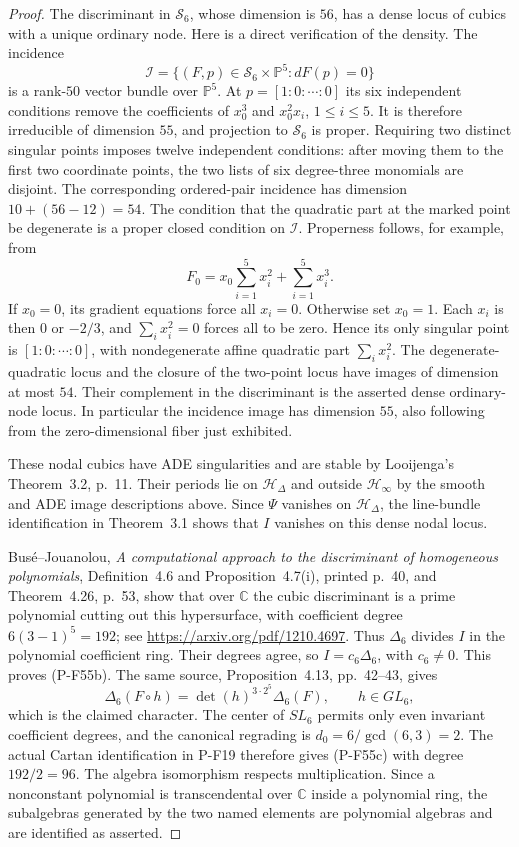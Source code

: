 \documentclass[11pt,a4paper]{article}
\begin{document}
\begin{proof}
The discriminant in $\mathscr S_6$, whose dimension is $56$,
has a dense locus of cubics with a unique ordinary node.
Here is a direct verification of the density. The incidence
\[
  \mathscr I=\{(F,p)\in\mathscr S_6\times\mathbb P^5:
                                  dF(p)=0\}
\]
is a rank-$50$ vector bundle over $\mathbb P^5$. At
$p=[1:0:\cdots:0]$ its six independent conditions remove
the coefficients of $x_0^3$ and $x_0^2x_i$, $1\le i\le5$.
It is therefore irreducible of dimension $55$, and projection
to $\mathscr S_6$ is proper. Requiring two distinct singular
points imposes twelve independent conditions: after moving
them to the first two coordinate points, the two lists of
six degree-three monomials are disjoint. The corresponding
ordered-pair incidence has dimension $10+(56-12)=54$.
The condition that the quadratic part at the marked point be
degenerate is a proper closed condition on $\mathscr I$.
Properness follows, for example, from
\[
        F_0=x_0\sum_{i=1}^5x_i^2+\sum_{i=1}^5x_i^3.
 \tag{P-F55f}
\]
If $x_0=0$, its gradient equations force all $x_i=0$.
Otherwise set $x_0=1$. Each $x_i$ is then $0$ or $-2/3$,
and $\sum_i x_i^2=0$ forces all to be zero. Hence its only
singular point is $[1:0:\cdots:0]$, with nondegenerate affine
quadratic part $\sum_i x_i^2$.
The degenerate-quadratic locus and the closure of the
two-point locus have images of dimension at most $54$.
Their complement in the discriminant is the asserted dense
ordinary-node locus. In particular the incidence image has
dimension $55$, also following from the zero-dimensional
fiber just exhibited.

These nodal cubics have ADE singularities and are stable by
Looijenga's Theorem~3.2, p.~11. Their periods lie on
$\mathcal H_\Delta$ and outside $\mathcal H_\infty$ by
the smooth and ADE image descriptions above.
Since $\Psi$ vanishes on $\mathcal H_\Delta$, the
line-bundle identification in Theorem~3.1 shows that $I$
vanishes on this dense nodal locus.

Bus\'e--Jouanolou, \emph{A computational approach to the
discriminant of homogeneous polynomials}, Definition~4.6 and
Proposition~4.7(i), printed p.~40, and Theorem~4.26, p.~53,
show that over $\mathbb C$ the cubic discriminant is a prime
polynomial cutting out this hypersurface, with coefficient
degree $6(3-1)^5=192$; see
\url{https://arxiv.org/pdf/1210.4697}.
Thus $\Delta_6$ divides $I$ in the polynomial coefficient
ring. Their degrees agree, so $I=c_6\Delta_6$, with
$c_6\ne0$. This proves (P-F55b).
The same source, Proposition~4.13, pp.~42--43, gives
\[
          \Delta_6(F\circ h)=\det(h)^{3\cdot2^5}\Delta_6(F),
                       \qquad h\in GL_6,
 \tag{P-F55g}
\]
which is the claimed character.
The center of $SL_6$ permits only even invariant coefficient
degrees, and the canonical regrading is $d_0=6/\gcd(6,3)=2$.
The actual Cartan identification in P-F19 therefore gives
(P-F55c) with degree $192/2=96$. The algebra isomorphism
respects multiplication. Since a nonconstant polynomial is
transcendental over $\mathbb C$ inside a polynomial ring,
the subalgebras generated by the two named elements are
polynomial algebras and are identified as asserted.


\end{proof}
\end{document}
